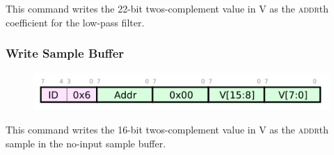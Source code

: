 This command writes the 22-bit twos-complement value in V as the
\textsc{addr}th coefficient for the low-pass filter.

\subsubsection{Write Sample Buffer}
\begin{figure}[h!]
\includegraphics[scale=1.5]{writesamp.cmd.svg}
\end{figure}

This command writes the 16-bit twos-complement value in V as the
\textsc{addr}th sample in the no-input sample buffer.

